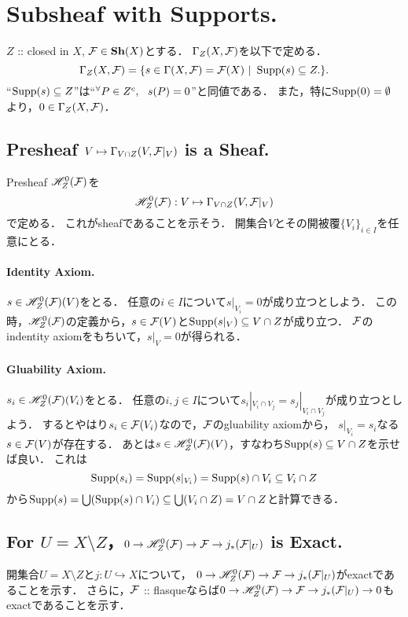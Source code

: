 \documentclass[a4paper]{jsarticle}
\newcommand{\Sh}{\mathbf{Sh}}
\begin{document}
\section{Subsheaf with Supports.} %
    $Z$ :: closed in $X$, $\shF \in \Sh(X)$とする．
    $\Gamma_Z(X, \mathcal{F})$を以下で定める．
    \[ \Gamma_Z(X, \mathcal{F})=\{ s \in \Gamma(X, \mathcal{F})=\mathcal{F}(X) ~|~ \operatorname{Supp}(s) \subseteq Z. \}. \]
    ``$\operatorname{Supp}(s) \subseteq Z$''は``${}^{\forall} P \in Z^c,~~ s(P)=0$''と同値である．
    また，特に$\operatorname{Supp}(0)=\emptyset$より，$0 \in \Gamma_Z(X, \mathcal{F})$．

    \subsection{Presheaf $V \mapsto \Gamma_{V \cap Z}(V, \mathcal{F}|_V)$ is a Sheaf.}
    Presheaf $\mathscr{H}_Z^0(\mathcal{F})$を
    \[ \mathscr{H}_Z^0(\mathcal{F}): V \mapsto \Gamma_{V \cap Z}(V, \mathcal{F}|_V) \]
    で定める．
    これがsheafであることを示そう．
    開集合$V$とその開被覆$\{V_i\}_{i \in I}$を任意にとる．

    \paragraph{Identity Axiom.}
    $s \in \mathscr{H}_Z^0(\mathcal{F})(V)$をとる．
    任意の$i \in I$について$s|_{V_i}=0$が成り立つとしよう．
    この時，$\mathscr{H}_Z^0(\mathcal{F})$の定義から，$s \in \mathcal{F}(V)$と$\operatorname{Supp} (s|_V) \subseteq V \cap Z$が成り立つ．
    $\mathcal{F}$のindentity axiomをもちいて，$s|_V=0$が得られる．

    \paragraph{Gluability Axiom.}
    $s_i \in \mathscr{H}_Z^0(\mathcal{F})(V_i)$をとる．
    任意の$i,j \in I$について$s_i|_{V_i \cap V_j}=s_j|_{V_i \cap V_j}$が成り立つとしよう．
    するとやはり$s_i \in \mathcal{F}(V_i)$なので，$\mathcal{F}$のgluability axiomから，
    $s|_{V_i}=s_i$なる$s \in \mathcal{F}(V)$が存在する．
    あとは$s \in \mathscr{H}_Z^0(\mathcal{F})(V)$，すなわち$\operatorname{Supp}(s) \subseteq V \cap Z$を示せば良い．
    これは
    \[ \operatorname{Supp}(s_i)=\operatorname{Supp}(s|_{V_i})=\operatorname{Supp}(s) \cap V_i \subseteq V_i \cap Z\]
    から$\operatorname{Supp}(s)=\bigcup (\operatorname{Supp}(s) \cap V_i) \subseteq \bigcup (V_i \cap Z)=V \cap Z$と計算できる．

    \subsection{For $U=X \setminus Z$，$0 \to \mathscr{H}_Z^0(\mathcal{F}) \to \mathcal{F} \to j_*(\mathcal{F}|_U)$ is Exact.}
    開集合$U=X \setminus Z$と$j: U \hookrightarrow X$について，
    $0 \to \mathscr{H}_Z^0(\mathcal{F}) \to \mathcal{F} \to j_*(\mathcal{F}|_U)$がexactであることを示す．
    さらに，$\mathcal{F}$ :: flasqueならば$0 \to \mathscr{H}_Z^0(\mathcal{F}) \to \mathcal{F} \to j_*(\mathcal{F}|_U) \to 0$もexactであることを示す．
\end{document}
